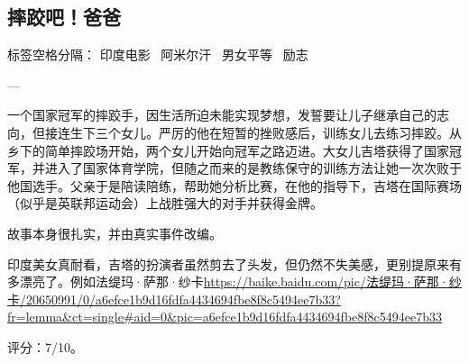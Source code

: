 \subsection{摔跤吧！爸爸}

标签空格分隔： 印度电影 \  阿米尔汗 \  男女平等 \  励志

---

一个国家冠军的摔跤手，因生活所迫未能实现梦想，发誓要让儿子继承自己的志向，但接连生下三个女儿。严厉的他在短暂的挫败感后，训练女儿去练习摔跤。从乡下的简单摔跤场开始，两个女儿开始向冠军之路迈进。大女儿吉塔获得了国家冠军，并进入了国家体育学院，但随之而来的是教练保守的训练方法让她一次次败于他国选手。父亲于是陪读陪练，帮助她分析比赛，在他的指导下，吉塔在国际赛场（似乎是英联邦运动会）上战胜强大的对手并获得金牌。

故事本身很扎实，并由真实事件改编。

印度美女真耐看，吉塔的扮演者虽然剪去了头发，但仍然不失美感，更别提原来有多漂亮了。例如法缇玛·萨那·纱卡\url{https://baike.baidu.com/pic/法缇玛·萨那·纱卡/20650991/0/a6efce1b9d16fdfa4434694fbe8f8c5494ee7b33?fr=lemma&ct=single#aid=0&pic=a6efce1b9d16fdfa4434694fbe8f8c5494ee7b33}

评分：7/10。
